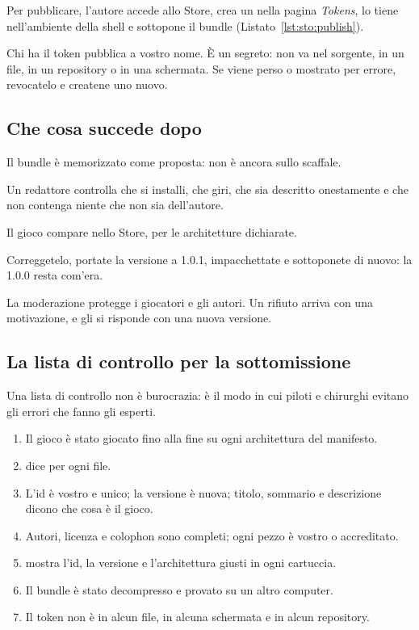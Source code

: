 
Per pubblicare, l'autore accede allo Store, crea un  nella pagina
\emph{Tokens}, lo tiene nell'ambiente della shell e sottopone il bundle
(Listato~\ref{lst:sto:publish}).

\begin{prgwarn}
Chi ha il token pubblica a vostro nome. È un segreto: non va nel sorgente, in
un file, in un repository o in una schermata. Se viene perso o mostrato per
errore, revocatelo e createne uno nuovo.
\end{prgwarn}

\subsection{Che cosa succede dopo}

\begin{description}[style=nextline,leftmargin=1.5em]
\item[In attesa.] Il bundle è memorizzato come proposta: non è ancora sullo
  scaffale.
\item[Revisione.] Un redattore controlla che si installi, che giri, che sia
  descritto onestamente e che non contenga niente che non sia dell'autore.
\item[Pubblicato.] Il gioco compare nello Store, per le architetture
  dichiarate.
\item[Un errore?] Correggetelo, portate la versione a 1.0.1, impacchettate e
  sottoponete di nuovo: la 1.0.0 resta com'era.
\end{description}

La moderazione protegge i giocatori e gli autori. Un rifiuto arriva con una
motivazione, e gli si risponde con una nuova versione.

\subsection{La lista di controllo per la sottomissione}

Una lista di controllo non è burocrazia: è il modo in cui piloti e chirurghi
evitano gli errori che fanno gli esperti.

\begin{enumerate}
\item Il gioco è stato giocato fino alla fine su ogni architettura del
  manifesto.
\item {} dice  per ogni
  file.
\item L'id è vostro e unico; la versione è nuova; titolo, sommario e
  descrizione dicono che cosa è il gioco.
\item Autori, licenza e colophon sono completi; ogni pezzo è vostro o
  accreditato.
\item {} mostra l'id, la versione e l'architettura giusti
  in ogni cartuccia.
\item Il bundle è stato decompresso e provato su un altro computer.
\item Il token non è in alcun file, in alcuna schermata e in alcun repository.
\end{enumerate}

